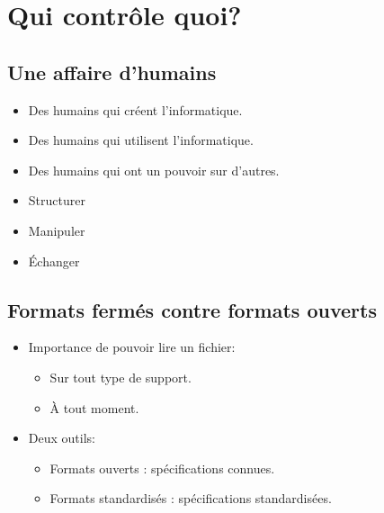 \section[Contrôler]{Qui contrôle quoi?}

\subsection{Une affaire d'humains}
\begin{slide}
	\begin{itemize}
		\item Des humains qui créent l'informatique.
		\item Des humains qui utilisent l'informatique.
		\item Des humains qui ont un pouvoir sur d'autres.
	\end{itemize}
\end{slide}

\begin{slide}

	
	\begin{itemize}
		\item Structurer
		\item Manipuler
		\item Échanger
	\end{itemize}
	

\end{slide}


\subsection{Formats fermés contre formats ouverts}

\begin{slide}
	\begin{itemize}
	\item Importance de pouvoir lire un fichier:
		\begin{itemize}
			\item Sur tout type de support.
			\item À tout moment.
		\end{itemize}
	\item Deux outils:
		\begin{itemize}
			\item Formats ouverts : spécifications connues.
			\item Formats standardisés : spécifications standardisées.
		\end{itemize}
	\end{itemize}
\end{slide}
